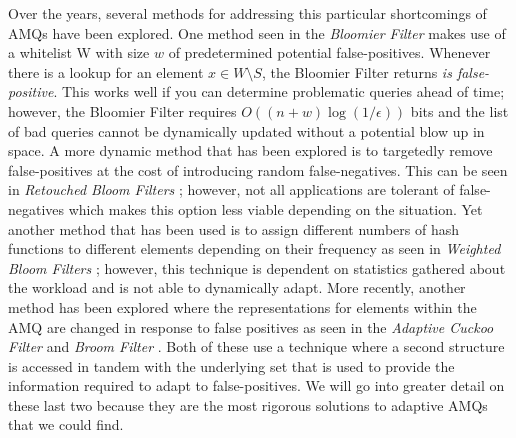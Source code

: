 \documentclass[../paper.tex]{subfiles}
\begin{document}
Over the years, several methods for addressing this particular shortcomings of AMQs have been explored.  
One method seen in the {\it Bloomier Filter} \cite{bloomier-filter} makes use of a whitelist 
W with size $w$ of predetermined potential false-positives.  Whenever there is a lookup 
for an element $x \in W \setminus S$, the Bloomier Filter returns \textit{is false-positive}.   
This works well if you can determine problematic queries ahead of time; however, the 
Bloomier Filter requires $O((n+w)\log(1/\epsilon))$ bits and the list of bad queries 
cannot be dynamically updated without a potential blow up in space.   A more dynamic 
method that has been explored is to targetedly remove false-positives at the cost of 
introducing random false-negatives.  This can be seen in {\it Retouched Bloom Filters} 
\cite{retouched-filter}; however, not all applications are tolerant of false-negatives 
which makes this option less viable depending on the situation.  Yet another method 
that has been used is to assign different numbers of hash functions to different elements
depending on their frequency as seen in {\it Weighted Bloom Filters} \cite{weighted-filter};
however, this technique is dependent on statistics gathered about the workload and is not able to dynamically
adapt.  More recently, another method has been explored where the representations for 
elements within the AMQ are changed in response to false positives as seen in the {\it 
Adaptive Cuckoo Filter} \cite{adaptive-cuckoo} and {\it Broom Filter} \cite{broom-filter}. 
Both of these use a technique where a second structure is accessed in tandem 
with the underlying set that is used to provide the information required to adapt to 
false-positives.  We will go into greater detail on these last two because they are the most
rigorous solutions to adaptive AMQs that we could find.  
\end{document}
